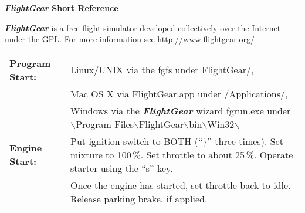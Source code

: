 \documentclass[10pt]{article}
\newcommand{\FlightGear}{{\itshape\bfseries FlightGear}}
\newcommand{\web}[1]{\href{#1}{#1}}
\newcommand{\longpage}{\enlargethispage{\baselineskip}}
\begin{document}
\longpage

\centerline{\large \textbf{\FlightGear{} Short Reference}}
\medskip

\scriptsize \noindent
 \FlightGear{} is a free flight simulator developed collectively over the
 Internet under the GPL.  For more information see  \web{http://www.flightgear.org/}\\

\hspace*{-8mm}
\begin{tabular}{ll}
\textbf{Program Start:}  & Linux/UNIX via the fgfs under FlightGear/,\\
                         & Mac OS X via FlightGear.app under /Applications/,\\
                         & Windows via the \FlightGear{} wizard fgrun.exe under
         $\backslash$Program Files$\backslash$FlightGear$\backslash$bin$\backslash$Win32$\backslash$\\

\textbf{Engine Start:}   & Put ignition switch to BOTH (``\}'' three times). Set mixture to 100\,\%.
                           Set throttle to about 25\,\%. Operate starter using the ``s'' key. \\
                         & Once the engine has started, set throttle back to idle.
                           Release parking brake, if applied.
\end{tabular}
\medskip
\end{document}
